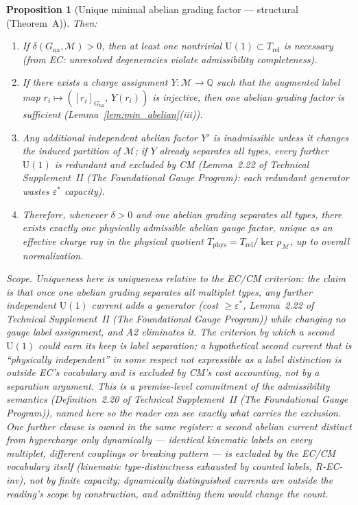 \documentclass[11pt]{article}
\newtheorem{proposition}[theorem]{Proposition}
\theoremstyle{definition}
\newcommand{\U}{\mathrm{U}}
\newcommand{\TSII}{Technical Supplement~II (\emph{The Foundational Gauge Program})}
\begin{document}
\begin{proposition}[Unique minimal abelian grading factor ---
structural (Theorem~A)]
Then:
\begin{enumerate}[label=(\roman*),nosep]
  \item If $\delta(G_{\mathrm{na}}, \mathcal{M}) > 0$, then at
  least one nontrivial $\U(1) \subset T_{\mathrm{rel}}$ is necessary
  (from EC: unresolved degeneracies violate admissibility completeness).
  \item If there exists a charge assignment $Y: \mathcal{M} \to \mathbb{Q}$
  such that the augmented label map
  $r_i \mapsto ([r_i]_{G_{\mathrm{na}}},\, Y(r_i))$
  is injective, then one abelian grading factor is sufficient
  (Lemma~\ref{lem:min_abelian}(iii)).
  \item Any additional independent abelian
  factor $Y'$ is inadmissible unless it changes the induced partition of
  $\mathcal{M}$; if $Y$ already separates all types, every further
  $\U(1)$ is redundant and excluded by CM
  (Lemma~2.22 of \TSII{}: each redundant generator wastes
  $\varepsilon^*$ capacity).
  \item Therefore, whenever $\delta > 0$ and one abelian grading
  separates all types, there exists exactly one physically admissible
  abelian gauge factor, unique as an effective charge ray in the
  physical quotient $T_{\mathrm{phys}} = T_{\mathrm{rel}} /
  \ker\rho_{\mathcal{M}}$, up to overall normalization.
\end{enumerate}
\emph{Scope.}  Uniqueness here is uniqueness \emph{relative to the
EC/CM criterion}: the claim is that once one abelian grading separates
all multiplet types, any further independent $\U(1)$ current adds a
generator (cost $\ge \varepsilon^*$, Lemma~2.22 of \TSII{})
while changing no gauge label assignment, and A2 eliminates it.  The
criterion by which a second $\U(1)$ could earn its keep is label
separation; a hypothetical second current that is ``physically
independent'' in some respect not expressible as a label distinction
is outside EC's vocabulary and is excluded by CM's cost accounting,
not by a separation argument.  This is a premise-level commitment of
the admissibility semantics (Definition~2.20 of \TSII{}),
named here so the reader can see exactly what carries the exclusion.
One further clause is owned in the same register: a second abelian
current distinct from hypercharge only \emph{dynamically} --- identical
kinematic labels on every multiplet, different couplings or breaking
pattern --- is excluded by the EC/CM vocabulary itself (kinematic
type-distinctness exhausted by counted labels, R-EC-inv), not by
finite capacity; dynamically distinguished currents are outside the
reading's scope by construction, and admitting them would change the
count.
\end{proposition}
\end{document}
